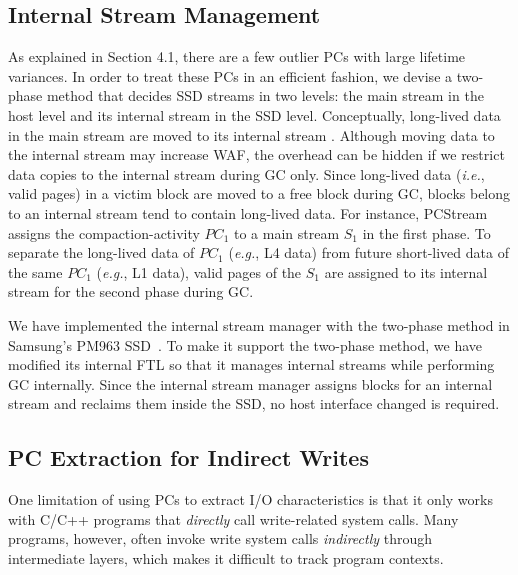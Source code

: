 \subsection{Internal Stream Management}
\vspace{-5pt}
As explained in Section 4.1, there are a few outlier PCs with large lifetime
variances. In order to treat these PCs in an efficient fashion, we devise a
two-phase method that decides SSD streams in two levels: the main stream in the
host level and its internal stream in the SSD level.  Conceptually, long-lived
data in the main stream are moved to its internal stream .
Although moving data to the internal stream may increase WAF, the overhead can
be hidden if we restrict data copies to the internal stream during GC only.
Since long-lived data ({\it i.e.}, valid pages) in a victim block are moved to a free
block during GC, blocks belong to an internal stream tend to contain long-lived
data.  For instance, \textsf{\small PCStream} assigns the compaction-activity
{\it $PC_1$} to a main stream {\it $S_1$} in the first phase.  To separate the
long-lived data of {\it $PC_1$} ({\it e.g.}, L4 data) from future short-lived data of
the same {\it $PC_1$} ({\it e.g.}, L1 data), valid pages of the {\it $S_1$} are
assigned to its internal stream for the second phase during GC.

We have implemented the internal stream manager with the two-phase method in
Samsung's PM963 SSD~\cite{PM963}. To make it support the two-phase method, we
have modified its internal FTL so that it manages internal streams while
performing GC internally.  Since the internal stream manager assigns blocks for
an internal stream and reclaims them inside the SSD, no host interface changed
is required.


\vspace{-10pt}
\subsection{PC Extraction for Indirect Writes}
\vspace{-5pt}
One limitation of using PCs to extract I/O characteristics is that it only
works with C/C++ programs that \textit{directly} call write-related system
calls.  Many programs, however, often invoke write system calls
\textit{indirectly} through intermediate layers, which makes it difficult to
track program contexts.

